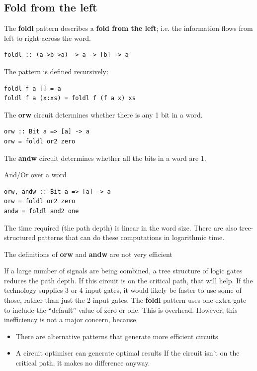 \documentclass[]{svmono}
\begin{document}
\subsection*{Fold from the left}
\label{sec:orge929dc5}

The \textbf{foldl} pattern describes a \textbf{fold from the left}; i.e. the
information flows from left to right across the word.

\begin{verbatim}
foldl :: (a->b->a) -> a -> [b] -> a
\end{verbatim}

The pattern is defined recursively:

\begin{verbatim}
foldl f a [] = a
foldl f a (x:xs) = foldl f (f a x) xs
\end{verbatim}

The \textbf{orw} circuit determines whether there is any 1 bit in a
word.

\begin{verbatim}
orw :: Bit a => [a] -> a
orw = foldl or2 zero
\end{verbatim}

The \textbf{andw} circuit determines whether all the bits in a word
are 1.

And/Or over a word

\begin{verbatim}
orw, andw :: Bit a => [a] -> a
orw = foldl or2 zero
andw = foldl and2 one
\end{verbatim}

The time required (the path depth) is linear in the word size.
There are also tree-structured patterns that can do these
computations in logarithmic time.

The definitions of \textbf{orw} and \textbf{andw} are not very efficient

If a large number of signals are being combined, a tree structure of
logic gates reduces the path depth.  If this circuit is on the
critical path, that will help.  If the technology supplies 3 or 4
input gates, it would likely be faster to use some of those, rather
than just the 2 input gates.  The \textbf{foldl} pattern uses one extra gate
to include the ``default'' value of zero or one.  This is overhead.
However, this inefficiency is not a major concern, because

\begin{itemize}
\item There are alternative patterns that generate more efficient circuits
\item A circuit optimiser can generate optimal results If the circuit
isn't on the critical path, it makes no difference anyway.
\end{itemize}
\end{document}
